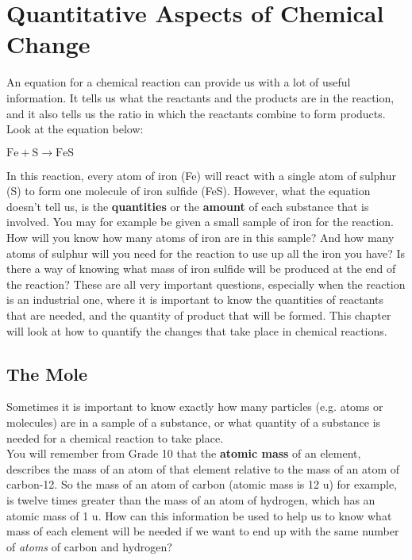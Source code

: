 \chapter{Quantitative Aspects of Chemical Change}
\label{chap:quant}

An equation for a chemical reaction can provide us with a lot of useful information. It tells us what the reactants and the products are in the reaction, and it also tells us the ratio in which the reactants combine to form products. Look at the equation below:

\begin{center}
${\text{Fe} + \text{S} \rightarrow \text{FeS}}$\\
\end{center}

In this reaction, every atom of iron (Fe) will react with a single atom of sulphur (S) to form one molecule of iron sulfide (FeS). However, what the equation doesn't tell us, is the \textbf{quantities} or the \textbf{amount} of each substance that is involved. You may for example be given a small sample of iron for the reaction. How will you know how many atoms of iron are in this sample? And how many atoms of sulphur will you need for the reaction to use up all the iron you have? Is there a way of knowing what mass of iron sulfide will be produced at the end of the reaction? These are all very important questions, especially when the reaction is an industrial one, where it is important to know the quantities of reactants that are needed, and the quantity of product that will be formed. This chapter will look at how to quantify the changes that take place in chemical reactions.



\section{The Mole}
\label{sec:quant:mole}

Sometimes it is important to know exactly how many particles (e.g. atoms or molecules) are in a sample of a substance, or what quantity of a substance is needed for a chemical reaction to take place.\\

You will remember from Grade 10 that the \textbf{atomic mass} of an element, describes the mass of an atom of that element relative to the mass of an atom of carbon-12. So the mass of an atom of carbon (atomic mass is 12 u) for example, is twelve times greater than the mass of an atom of hydrogen, which has an atomic mass of 1 u. How can this information be used to help us to know what mass of each element will be needed if we want to end up with the same number of \textit{atoms} of carbon and hydrogen?\\

